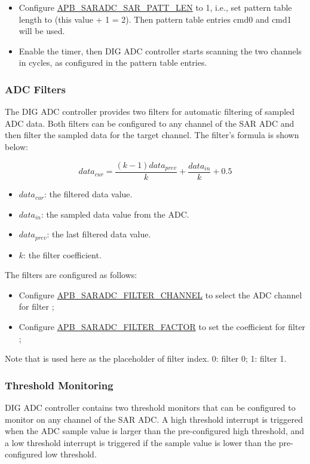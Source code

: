 \documentclass[main\_\_EN.tex]{subfiles}
\begin{document}
\begin{itemize}
    \item Configure \hyperref[fielddesc:APBSARADCSARADCSARPATTLEN]{APB\_SARADC\_SAR\_PATT\_LEN} to 1, i.e., set pattern table length to (this value + 1 = 2). Then pattern table entries cmd0 and cmd1 will be used.
    \item Enable the timer, then DIG ADC controller starts scanning the two channels in cycles, as configured in the pattern table entries.
\end{itemize}







\subsubsection{ADC Filters}
The DIG ADC controller provides two filters for automatic filtering of sampled ADC data. Both filters can be configured to any channel of the SAR ADC and then filter the sampled data for the target channel. The filter's formula is shown below:

\[data_{cur} = \frac{(k-1)data_{prev}}{k}+\frac{data_{in}}{k}+0.5\]

\begin{itemize}
    \item \(data_{cur}\): the filtered data value.
    \item \(data_{in}\): the sampled data value from the ADC.
    \item \(data_{prev}\): the last filtered data value.
    \item \(k\): the filter coefficient.
\end{itemize}

The filters are configured as follows:
\begin{itemize}
\item Configure \hyperref[fielddesc:APBSARADCAPBSARADCFILTERCHANNEL1]{APB\_SARADC\_FILTER\_CHANNEL} to select the ADC channel for filter ;
\item Configure \hyperref[fielddesc:APBSARADCAPBSARADCFILTERCHANNEL1]{APB\_SARADC\_FILTER\_FACTOR} to set the coefficient for filter ;
\end{itemize}

Note that  is used here as the placeholder of filter index. 0: filter 0; 1: filter 1.

\subsubsection{Threshold Monitoring}
DIG ADC controller contains two threshold monitors that can be configured to monitor on any channel of the SAR ADC. A high threshold interrupt is triggered when the ADC sample value is larger than the pre-configured high threshold, and a low threshold interrupt is triggered if the sample value is lower than the pre-configured low threshold.
\end{document}
